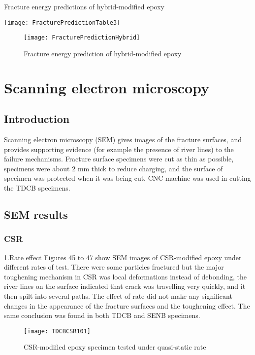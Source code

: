 \documentclass[numbers=noendperiod,chapterprefix=on]{icldt} %
\begin{document}
\begin{table}[!hp]
\centering
\caption{Fracture energy predictions of hybrid-modified epoxy} %
\texttt{[image: FracturePredictionTable3]}
\end{table}
\FloatBarrier

\begin{figure}[!hp]
\centering
\texttt{[image: FracturePredictionHybrid]}
\caption{Fracture energy prediction of hybrid-modified epoxy}
\end{figure}
\FloatBarrier

\section{Scanning electron microscopy }
\subsection{Introduction}

Scanning electron microscopy (SEM) gives images of the fracture surfaces, and provides supporting evidence (for example the presence of river lines) to the failure mechanisms. Fracture surface specimens were cut as thin as possible, specimens were about 2 mm thick to reduce charging, and the surface of specimen was protected when it was being cut. CNC machine was used in cutting the TDCB specimens.

\subsection{SEM results }
\subsubsection{CSR}

1.Rate effect \newline
Figures 45 to 47 show SEM images of CSR-modified epoxy under different rates of test. There were some particles fractured but the major toughening mechanism in CSR was local deformations instead of debonding, the river lines on the surface indicated that crack was travelling very quickly, and it then spilt into several paths. The effect of rate did not make any significant changes in the appearance of the fracture surfaces and the toughening effect. The same conclusion was found in both TDCB and SENB specimens.

\begin{figure}[!htpb]
\centering
\texttt{[image: TDCBCSR101]}
\caption{CSR-modified epoxy specimen tested under quasi-static rate }
\end{figure}
\FloatBarrier
\end{document}
